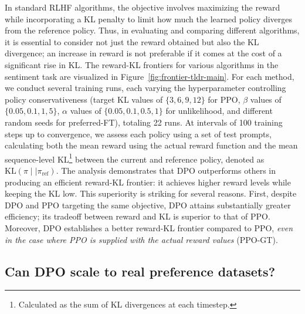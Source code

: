 In standard RLHF algorithms, the objective involves maximizing the reward while incorporating a KL penalty to limit how much the learned policy diverges from the reference policy. Thus, in evaluating and comparing different algorithms, it is essential to consider not just the reward obtained but also the KL divergence; an increase in reward is not preferable if it comes at the cost of a significant rise in KL. The reward-KL frontiers for various algorithms in the sentiment task are visualized in Figure~\ref{fig:frontier-tldr-main}. For each method, we conduct several training runs, each varying the hyperparameter controlling policy conservativeness (target KL values of $\{3,6,9,12\}$ for PPO, $\beta$ values of $\{0.05,0.1,1,5\}$, $\alpha$ values of $\{0.05,0.1,0.5,1\}$ for unlikelihood, and different random seeds for preferred-FT), totaling 22 runs. At intervals of 100 training steps up to convergence, we assess each policy using a set of test prompts, calculating both the mean reward using the actual reward function and the mean sequence-level KL\footnote{Calculated as the sum of KL divergences at each timestep.} between the current and reference policy, denoted as $\text{KL}\left(\pi\mid \mid \pi_\text{ref}\right)$. The analysis demonstrates that DPO outperforms others in producing an efficient reward-KL frontier: it achieves higher reward levels while keeping the KL low. This superiority is striking for several reasons. First, despite DPO and PPO targeting the same objective, DPO attains substantially greater efficiency; its tradeoff between reward and KL is superior to that of PPO. Moreover, DPO establishes a better reward-KL frontier compared to PPO, \emph{even in the case where PPO is supplied with the actual reward values} (PPO-GT).

\subsection{Can DPO scale to real preference datasets?}
\label{sec:dpo-real-datasets}

